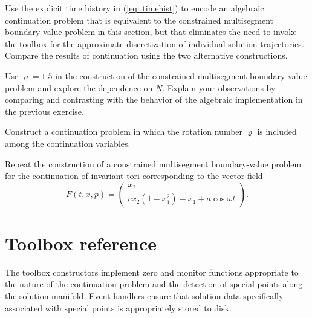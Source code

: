 \begin{exercises}
\item Use the explicit time history in (\ref{eq: timehist}) to encode an algebraic continuation problem that is equivalent to the constrained multisegment boundary-value problem in this section, but that eliminates the need to invoke the  toolbox for the approximate discretization of individual solution trajectories. Compare the results of continuation using the two alternative constructions.
\item Use $\varrho=1.5$ in the construction of the constrained multisegment boundary-value problem and explore the dependence on $N$. Explain your observations by comparing and contrasting with the behavior of the algebraic implementation in the previous exercise.
\item Construct a continuation problem in which the rotation number $\varrho$ is included among the continuation variables.
\item Repeat the construction of a constrained multisegment boundary-value problem for the continuation of invariant tori corresponding to the vector field
\[
F(t,x,p) = \left(\begin{array}{c}x_2\\cx_2(1-x_1^2)-x_1+a\cos\omega t\end{array}\right).
\]
\end{exercises}

\section{Toolbox reference}
The toolbox constructors implement zero and monitor functions appropriate to the nature of the continuation problem and the detection of special points along the solution manifold. Event handlers ensure that solution data specifically associated with special points is appropriately stored to disk.

